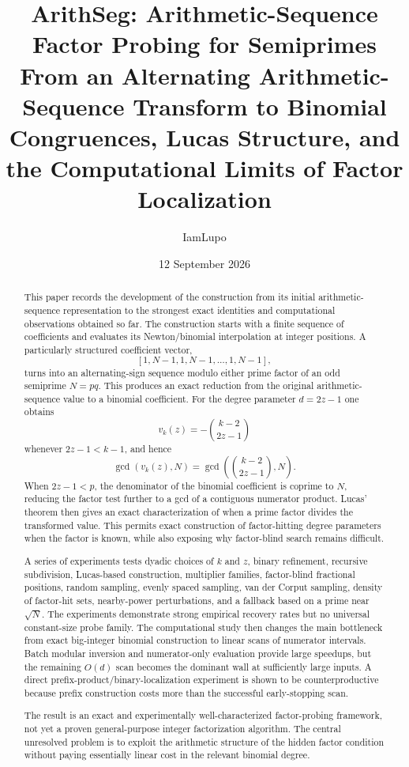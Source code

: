 \documentclass[11pt,a4paper]{article}
\title{\textbf{ArithSeg: Arithmetic-Sequence Factor Probing for Semiprimes}\\
\large From an Alternating Arithmetic-Sequence Transform to Binomial Congruences, Lucas Structure, and the Computational Limits of Factor Localization}
\author{IamLupo}
\date{12 September 2026}
\newcommand{\Arith}{\mathrm{ArithSeg}}
\begin{document}
\maketitle

\begin{abstract}
This paper records the development of the \Arith{} construction from its initial arithmetic-sequence representation to the strongest exact identities and computational observations obtained so far. The construction starts with a finite sequence of coefficients and evaluates its Newton/binomial interpolation at integer positions. A particularly structured coefficient vector,
\[
[1,N-1,1,N-1,\ldots,1,N-1],
\]
turns into an alternating-sign sequence modulo either prime factor of an odd semiprime $N=pq$. This produces an exact reduction from the original arithmetic-sequence value to a binomial coefficient. For the degree parameter $d=2z-1$ one obtains
\[
v_k(z)=-\binom{k-2}{2z-1}
\]
whenever $2z-1<k-1$, and hence
\[
\gcd(v_k(z),N)=\gcd\!\left(\binom{k-2}{2z-1},N\right).
\]
When $2z-1<p$, the denominator of the binomial coefficient is coprime to $N$, reducing the factor test further to a gcd of a contiguous numerator product. Lucas' theorem then gives an exact characterization of when a prime factor divides the transformed value. This permits exact construction of factor-hitting degree parameters when the factor is known, while also exposing why factor-blind search remains difficult.

A series of experiments tests dyadic choices of $k$ and $z$, binary refinement, recursive subdivision, Lucas-based construction, multiplier families, factor-blind fractional positions, random sampling, evenly spaced sampling, van der Corput sampling, density of factor-hit sets, nearby-power perturbations, and a fallback based on a prime near $\sqrt N$. The experiments demonstrate strong empirical recovery rates but no universal constant-size probe family. The computational study then changes the main bottleneck from exact big-integer binomial construction to linear scans of numerator intervals. Batch modular inversion and numerator-only evaluation provide large speedups, but the remaining $O(d)$ scan becomes the dominant wall at sufficiently large inputs. A direct prefix-product/binary-localization experiment is shown to be counterproductive because prefix construction costs more than the successful early-stopping scan.

The result is an exact and experimentally well-characterized factor-probing framework, not yet a proven general-purpose integer factorization algorithm. The central unresolved problem is to exploit the arithmetic structure of the hidden factor condition without paying essentially linear cost in the relevant binomial degree.
\end{abstract}
\end{document}
